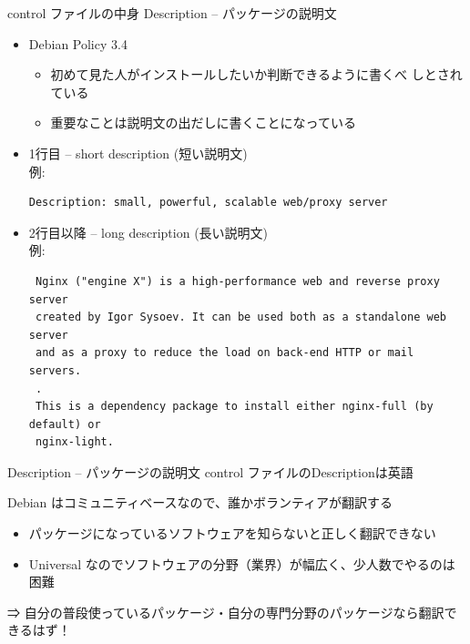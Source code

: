  \begin{frame}[containsverbatim]{control ファイルの中身}
  Description -- パッケージの説明文

  \begin{itemize}
   
   \item Debian Policy 3.4
	 \begin{itemize}
	  \item 初めて見た人がインストールしたいか判断できるように書くべ
		しとされている
	  \item 重要なことは説明文の出だしに書くことになっている
	 \end{itemize}
  
 \item 1行目 -- short description (短い説明文)\\
       例:\\
       {
  \scriptsize
\begin{verbatim}
Description: small, powerful, scalable web/proxy server
\end{verbatim}
}
 \item 2行目以降 -- long description (長い説明文)\\
       例:\\
  \scriptsize
\begin{verbatim}
 Nginx ("engine X") is a high-performance web and reverse proxy server
 created by Igor Sysoev. It can be used both as a standalone web server
 and as a proxy to reduce the load on back-end HTTP or mail servers.
 .
 This is a dependency package to install either nginx-full (by default) or
 nginx-light.
\end{verbatim}
  \end{itemize}
 \end{frame}

  \begin{frame}{Description -- パッケージの説明文}
   control ファイルのDescriptionは英語

   Debian はコミュニティベースなので、誰かボランティアが翻訳する

   \pause
   \begin{itemize}
    \item パッケージになっているソフトウェアを知らないと正しく翻訳できない
    \item Universal なのでソフトウェアの分野（業界）が幅広く、少人数でやるのは困難
   \end{itemize}\pause
   ⇒ 自分の普段使っているパッケージ・自分の専門分野のパッケージなら翻訳できるはず！
  \end{frame}
 
